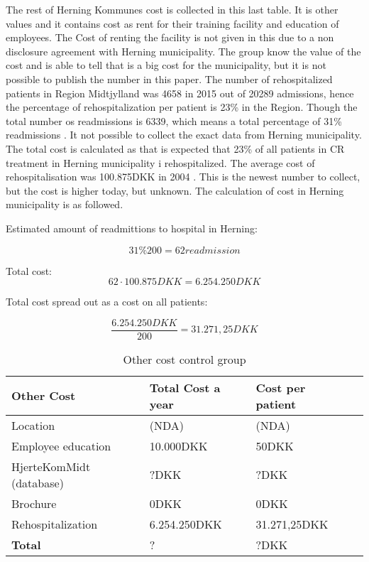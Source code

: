 The rest of Herning Kommunes cost is collected in this last table. It is other values and it contains cost as rent for their training facility and education of employees. The Cost of renting the facility is not given in this due to a non disclosure agreement with Herning municipality. The group know the value of the cost and is able to tell that is a big cost for the municipality, but it is not possible to publish the number in this paper. The number of rehospitalized patients in Region Midtjylland was 4658 in 2015 out of 20289 admissions, hence the percentage of rehospitalization per patient is 23\% in the Region. Though the total number os readmissions is 6339, which means a total percentage of 31\% readmissions \cite{hjertetal}. It not possible to collect the exact data from Herning municipality. The total cost is calculated as that is expected that 23\% of all patients in CR treatment in Herning municipality i rehospitalized. The average cost of rehospitalisation was 100.875DKK in 2004 \cite{rasmussen2011hjerterehabilitering}. This is the newest number to collect, but the cost is higher today, but unknown. The calculation of cost in Herning municipality is as followed.

Estimated amount of readmittions to hospital in Herning:

$$31\%200= 62 readmission$$

Total cost:
$$62\cdot100.875DKK=6.254.250DKK$$

Total cost spread out as a cost on all patients:

$$\frac{6.254.250DKK}{200}=31.271,25DKK$$


\begin{table}[H]
\begin{longtabu} to 
    \textbf{Other Cost} &\textbf{Total Cost a year} & \textbf{Cost per patient} \\[-1ex]
    \midrule
    Location   &  (NDA) & (NDA) \\ \hline
    Employee education   & 10.000DKK & 50DKK  \\ \hline
    HjerteKomMidt (database)  & ?DKK &   ?DKK \\ \hline
    Brochure & 0DKK & 0DKK \\ \hline
    Rehospitalization & 6.254.250DKK & 31.271,25DKK \\
    \hline \hline \hline
    \textbf{Total} & ?  & ?DKK
    \newline
    \newline
   \end{longtabu}
\caption{Other cost control group}
\label{tab: OC}
\end{table}



